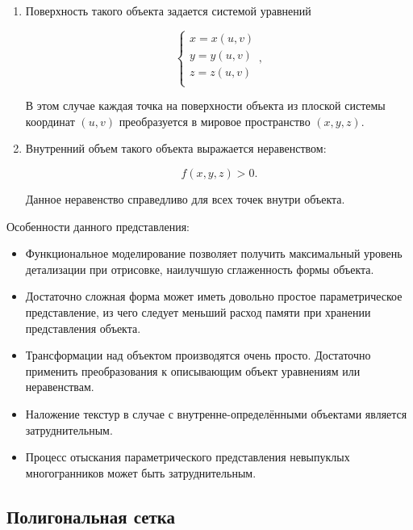 \begin{enumerate}
	\item Поверхность такого объекта задается системой уравнений

	\begin{equation}
		\left\{
		\begin{array}{l}
			x = x(u, v) \\
			y = y(u, v) \\
			z = z(u, v) \\
		\end{array}
		\right.,
	\end{equation}
	
	В этом случае каждая точка на поверхности объекта из плоской системы координат $(u, v)$ преобразуется в мировое пространство $(x, y, z)$.

	\item Внутренний объем такого объекта выражается неравенством:
	
	\begin{equation}
		f(x, y, z) > 0.
	\end{equation}

	Данное неравенство справедливо для всех точек внутри объекта.
\end{enumerate}

Особенности данного представления:

\begin{itemize}[$\bullet$]
	\item Функциональное моделирование позволяет получить максимальный уровень детализации при отрисовке, наилучшую сглаженность формы объекта.
	\item Достаточно сложная форма может иметь довольно простое параметрическое представление, из чего следует меньший расход памяти при хранении представления объекта.
	\item Трансформации над объектом производятся очень просто. Достаточно применить преобразования к описывающим объект уравнениям или неравенствам.
	\item Наложение текстур в случае с внутренне-определёнными объектами является затруднительным.
	\item Процесс отыскания параметрического представления невыпуклых многогранников может быть затруднительным.
\end{itemize}

\subsection{Полигональная сетка}

